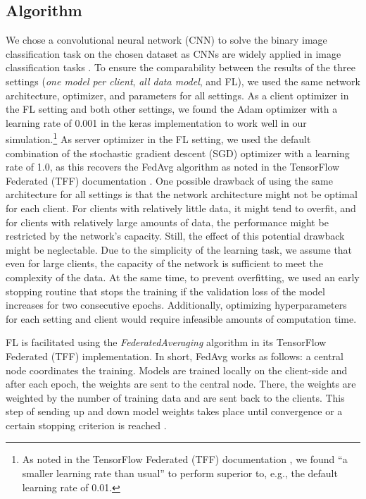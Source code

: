 \subsection{Algorithm\label{sec:methodology_algorithm}}
We chose a convolutional neural network (CNN) to solve the binary image classification task on the chosen dataset \citep{schlagenhauf2021industrial} as CNNs are widely applied in image classification tasks \citep{lecun1995convolutional, krizhevsky2012imagenet}. To ensure the comparability between the results of the three settings (\emph{one model per client}, \emph{all data model}, and FL), we used the same network architecture, optimizer, and parameters for all settings. As a client optimizer in the FL setting and both other settings, we found the Adam optimizer \citep{adamkingma2014} with a learning rate of 0.001 in the keras \citep{keraschollet2015} implementation to work well in our simulation.\footnote{As noted in the TensorFlow Federated (TFF) documentation \citep{tensorflow2015-whitepaper}, we found ``a smaller learning rate than usual'' to perform superior to, e.g., the default learning rate of 0.01.} As server optimizer in the FL setting, we used the default combination of the stochastic gradient descent (SGD) optimizer with a learning rate of 1.0, as this recovers the FedAvg algorithm as noted in the TensorFlow Federated (TFF) documentation \citep{tensorflow2015-whitepaper}.
One possible drawback of using the same architecture for all settings is that the network architecture might not be optimal for each client. For clients with relatively little data, it might tend to overfit, and for clients with relatively large amounts of data, the performance might be restricted by the network's capacity. Still, the effect of this potential drawback might be neglectable. %
Due to the simplicity of the learning task, we assume that even for large clients, the capacity of the network is sufficient to meet the complexity of the data. At the same time, to prevent overfitting, we used an early stopping routine that stops the training if the validation loss of the model increases for two consecutive epochs. Additionally, optimizing hyperparameters for each setting and client would require infeasible amounts of computation time. %

FL is facilitated using the \emph{FederatedAveraging} algorithm \citep{mcmahan2017communication} in its TensorFlow Federated (TFF) \citep{tensorflow2015-whitepaper} implementation. In short, FedAvg works as follows: a central node coordinates the training. Models are trained locally on the client-side and after each epoch, the weights are sent to the central node. There, the weights are weighted by the number of training data and are sent back to the clients. This step of sending up and down model weights takes place until convergence or a certain stopping criterion is reached \citep{mcmahan2017communication}.

